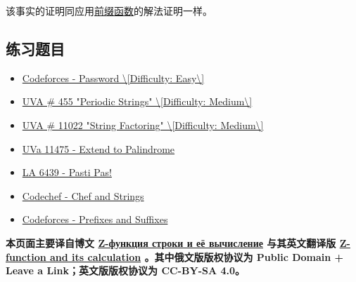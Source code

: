 该事实的证明同应用\href{./prefix-function.md}{前缀函数}的解法证明一样。

\subsection{练习题目}

\begin{itemize}
\item \href{http://codeforces.com/problemset/problem/126/B}{Codeforces - Password \textbackslash{}[Difficulty: Easy\textbackslash{}]}
\item \href{http://uva.onlinejudge.org/index.php?option=onlinejudge&page=show_problem&problem=396}{UVA \# 455 "Periodic Strings" \textbackslash{}[Difficulty: Medium\textbackslash{}]}
\item \href{http://uva.onlinejudge.org/index.php?option=onlinejudge&page=show_problem&problem=1963}{UVA \# 11022 "String Factoring" \textbackslash{}[Difficulty: Medium\textbackslash{}]}
\item \href{http://uva.onlinejudge.org/index.php?option=com_onlinejudge&Itemid=8&category=24&page=show_problem&problem=2470}{UVa 11475 - Extend to Palindrome}
\item \href{https://icpcarchive.ecs.baylor.edu/index.php?option=com_onlinejudge&Itemid=8&category=588&page=show_problem&problem=4450}{LA 6439 - Pasti Pas!}
\item \href{https://www.codechef.com/problems/CHSTR}{Codechef - Chef and Strings}
\item \href{http://codeforces.com/problemset/problem/432/D}{Codeforces - Prefixes and Suffixes}
\end{itemize}

\hr

\textbf{本页面主要译自博文 \href{http://e-maxx.ru/algo/z_function}{Z-функция строки и её вычисление} 与其英文翻译版 \href{https://cp-algorithms.com/string/z-function.html}{Z-function and its calculation} 。其中俄文版版权协议为 Public Domain + Leave a Link；英文版版权协议为 CC-BY-SA 4.0。}
